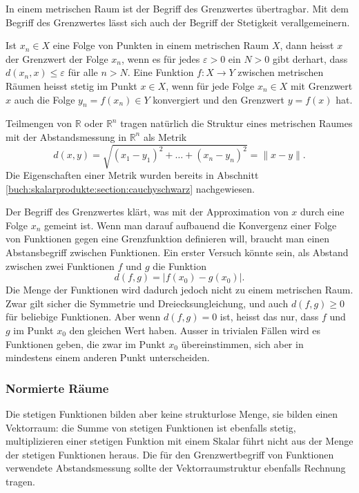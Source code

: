 In einem metrischen Raum ist der Begriff des Grenzwertes übertragbar.
Mit dem Begriff des Grenzwertes lässt sich auch der Begriff der
Stetigkeit verallgemeinern.

\begin{definition}
Ist $x_n\in X$ eine Folge von Punkten in einem metrischen Raum $X$,
dann heisst $x$ der Grenzwert der Folge $x_n$, wenn es für jedes
$\varepsilon>0$ ein $N>0$ gibt derhart, dass
$d(x_n,x)\le \varepsilon$ für alle $n>N$.
Eine Funktion $f\colon X\to Y$ zwischen metrischen Räumen heisst
stetig im Punkt $x\in X$, wenn für jede Folge $x_n\in X$ mit
Grenzwert $x$ auch die Folge $y_n=f(x_n)\in Y$ konvergiert und
den Grenzwert $y=f(x)$ hat.
\end{definition}

Teilmengen von $\mathbb{R}$ oder $\mathbb{R}^n$ tragen natürlich
die Struktur eines metrischen Raumes mit der Abstandsmessung in 
$\mathbb{R}^n$ als Metrik
\[
d(x,y) = \sqrt{(x_1-y_1)^2 + \ldots + (x_n-y_n)^2} = \|x-y\|.
\]
Die Eigenschaften einer Metrik wurden bereits in Abschnitt
\ref{buch:skalarprodukte:section:cauchyschwarz} nachgewiesen.

Der Begriff des Grenzwertes klärt, was mit der Approximation von $x$
durch eine Folge $x_n$ gemeint ist.
Wenn man darauf aufbauend die Konvergenz einer Folge von Funktionen
gegen eine Grenzfunktion definieren will, braucht man einen Abstansbegriff
zwischen Funktionen.
Ein erster Versuch könnte sein, als Abstand zwischen zwei Funktionen
$f$ und $g$ die Funktion
\[
d(f,g) = |f(x_0) - g(x_0)|.
\]
Die Menge der Funktionen wird dadurch jedoch nicht zu einem metrischen
Raum.
Zwar gilt sicher die Symmetrie und Dreiecksungleichung, und auch 
$d(f,g)\ge 0$ für beliebige Funktionen.
Aber wenn $d(f,g)=0$ ist, heisst das nur, dass $f$ und $g$ im Punkt
$x_0$ den gleichen Wert haben.
Ausser in trivialen Fällen wird es Funktionen geben, die zwar im Punkt
$x_0$ übereinstimmen, sich aber in mindestens einem anderen Punkt
unterscheiden.

%
%
\subsubsection{Normierte Räume}
Die stetigen Funktionen bilden aber keine strukturlose Menge, sie
bilden einen Vektorraum: die Summe von stetigen Funktionen ist ebenfalls
stetig, multiplizieren einer stetigen Funktion mit einem Skalar führt
nicht aus der Menge der stetigen Funktionen heraus.
Die für den Grenzwertbegriff von Funktionen verwendete Abstandsmessung 
sollte der Vektorraumstruktur ebenfalls Rechnung tragen.

